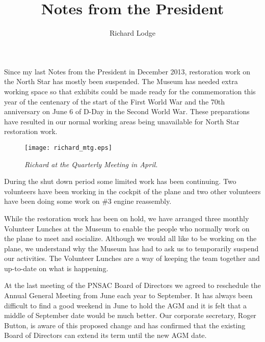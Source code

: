 
%


\title{Notes from the President}
\author{Richard Lodge}

\maketitle

Since my last Notes from the President in December 2013, restoration
work on the North Star has mostly been suspended. The Museum has
needed extra working space so that exhibits could be made ready for
the commemoration this year of the centenary of the start of the First
World War and the 70th anniversary on June 6 of D-Day in the Second
World War. These preparations have resulted in our normal working
areas being unavailable for North Star restoration work.

\begin{figure}[htbp]
  \vspace{2em}
  \centering
  \texttt{[image: richard\_mtg.eps]}
  \caption*{\small \em Richard at the Quarterly Meeting in April.}
  \label{fig:richard_mtg}
\end{figure}

During the shut down period some limited work has been continuing. Two
volunteers have been working in the cockpit of the plane and two other
volunteers have been doing some work on \#3 engine reassembly.

While the restoration work has been on hold, we have arranged three
monthly Volunteer Lunches at the Museum to enable the people who
normally work on the plane to meet and socialize. Although we would
all like to be working on the plane, we understand why the Museum has
had to ask us to temporarily suspend our activities. The Volunteer
Lunches are a way of keeping the team together and up-to-date on what
is happening. 

At the last meeting of the PNSAC Board of Directors we agreed to
reschedule the Annual General Meeting from June each year to
September. It has always been difficult to find a good weekend in June
to hold the AGM and it is felt that a middle of September date would
be much better. Our corporate secretary, Roger Button, is aware of
this proposed change and has confirmed that the existing Board of
Directors can extend its term until the new AGM date.

